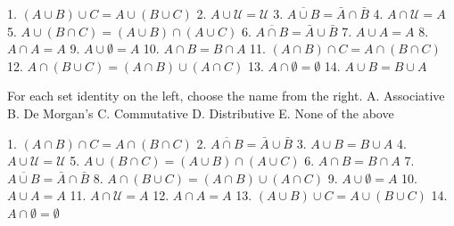 \begin{enumerate}
1. $(A \cup B) \cup C=A \cup(B \cup C)$
2. $A \cup \mathcal{U}=\mathcal{U}$
3. $\overline{A \cup B}=\bar{A} \cap \bar{B}$
4. $A \cap \mathcal{U}=A$
5. $A \cup(B \cap C)=(A \cup B) \cap(A \cup C)$
6. $\overline{A \cap B}=\bar{A} \cup \bar{B}$
7. $A \cup A=A$
8. $A \cap A=A$
9. $A \cup \emptyset=A$
10. $A \cap B=B \cap A$
11. $(A \cap B) \cap C=A \cap(B \cap C)$
12. $A \cap(B \cup C)=(A \cap B) \cup(A \cap C)$
13. $A \cap \emptyset=\emptyset$
14. $A \cup B=B \cup A$
















For each set identity on the left, choose the name from the right.
A. Associative
B. De Morgan's
C. Commutative
D. Distributive
E. None of the above


1. $(A \cap B) \cap C=A \cap(B \cap C)$
2. $\overline{A \cap B}=\bar{A} \cup \bar{B}$
3. $A \cup B=B \cup A$
4. $A \cup \mathcal{U}=\mathcal{U}$
5. $A \cup(B \cap C)=(A \cup B) \cap(A \cup C)$
6. $A \cap B=B \cap A$
7. $\overline{A \cup B}=\bar{A} \cap \bar{B}$
8. $A \cap(B \cup C)=(A \cap B) \cup(A \cap C)$
9. $A \cup \emptyset=A$
10. $A \cup A=A$
11. $A \cap \mathcal{U}=A$
12. $A \cap A=A$
13. $(A \cup B) \cup C=A \cup(B \cup C)$
14. $A \cap \emptyset=\emptyset$


\end{enumerate}
